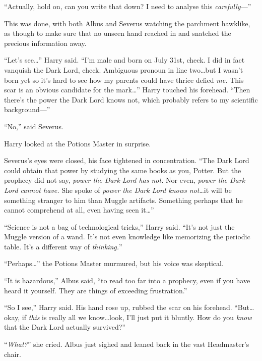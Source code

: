 “Actually, hold on, can you write that down? I need to analyse this \emph{carefully}—”

This was done, with both Albus and Severus watching the parchment hawklike, as though to make sure that no unseen hand reached in and snatched the precious information away.

“Let’s see…” Harry said. “I’m male and born on July 31st, check. I did in fact vanquish the Dark Lord, check. Ambiguous pronoun in line two…but I wasn’t born yet so it’s hard to see how my parents could have thrice defied \emph{me.} This scar is an obvious candidate for the mark…” Harry touched his forehead. “Then there’s the power the Dark Lord knows not, which probably refers to my scientific background—”

“No,” said Severus.

Harry looked at the Potions Master in surprise.

Severus’s eyes were closed, his face tightened in concentration. “The Dark Lord could obtain that power by studying the same books as you, Potter. But the prophecy did not say, \emph{power the Dark Lord has not.} Nor even, \emph{power the Dark Lord cannot have.} She spoke of \emph{power the Dark Lord knows not}…it will be something stranger to him than Muggle artifacts. Something perhaps that he cannot comprehend at all, even having seen it…”

“Science is not a bag of technological tricks,” Harry said. “It’s not just the Muggle version of a wand. It’s not even knowledge like memorizing the periodic table. It’s a different way of \emph{thinking.}”

“Perhaps…” the Potions Master murmured, but his voice was skeptical.

“It is hazardous,” Albus said, “to read too far into a prophecy, even if you have heard it yourself. They are things of exceeding frustration.”

“So I see,” Harry said. His hand rose up, rubbed the scar on his forehead. “But…okay, if \emph{this} is really all we know…look, I’ll just put it bluntly. How do you \emph{know} that the Dark Lord actually survived?”

“\emph{What?}” she cried. Albus just sighed and leaned back in the vast Headmaster’s chair.

